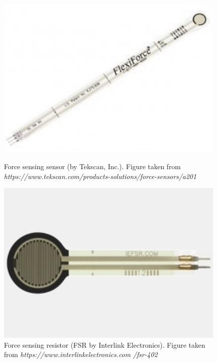 \begin{figure}[!htb]
   \begin{minipage}{0.45\textwidth}
     \centering
     \includegraphics[width=1\textwidth]{figures/A201.jpg}
     \caption{Force sensing sensor (by Tekscan, Inc.). Figure taken from \textit{https://www.tekscan.com/products-solutions/force-sensors/a201}}
     \label{fig:tekscana201}
   \end{minipage}\hfill
   \begin{minipage}{0.45\textwidth}
     \centering
     \includegraphics[width=1\textwidth]{figures/FSR-402.jpg}
     \caption{Force sensing resistor (FSR by Interlink Electronics). Figure taken from \textit{https://www.interlinkelectronics.com
     /fsr-402}}
     \label{fig:fsr402}
   \end{minipage}
\end{figure}



